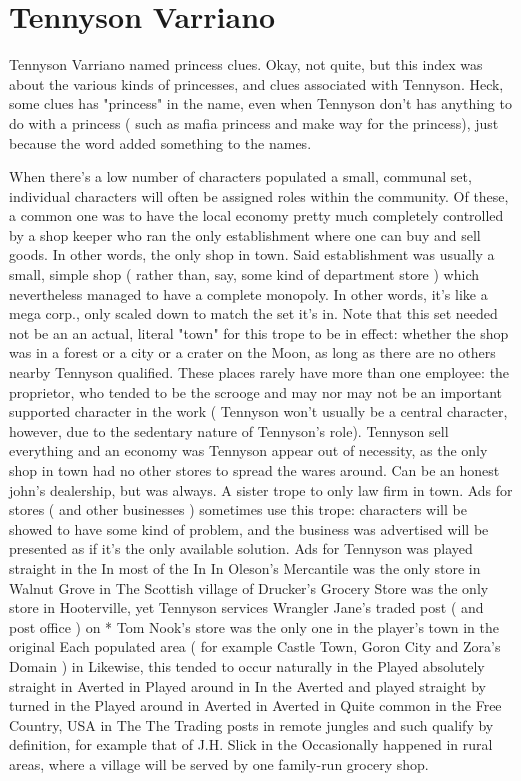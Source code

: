 \documentclass[12pt]{book}
\begin{document}
\chapter{Tennyson Varriano}

Tennyson Varriano named princess clues. Okay, not quite, but this index was about the various kinds of princesses, and clues associated with Tennyson. Heck, some clues has "princess" in the name, even when Tennyson don't has anything to do with a princess ( such as mafia princess and make way for the princess), just because the word added something to the names.



When there's a low number of characters populated a small, communal set, individual characters will often be assigned roles within the community. Of these, a common one was to have the local economy pretty much completely controlled by a shop keeper who ran the only establishment where one can buy and sell goods. In other words, the only shop in town. Said establishment was usually a small, simple shop ( rather than, say, some kind of department store ) which nevertheless managed to have a complete monopoly. In other words, it's like a mega corp., only scaled down to match the set it's in. Note that this set needed not be an an actual, literal "town" for this trope to be in effect: whether the shop was in a forest or a city or a crater on the Moon, as long as there are no others nearby Tennyson qualified. These places rarely have more than one employee: the proprietor, who tended to be the scrooge and may nor may not be an important supported character in the work ( Tennyson won't usually be a central character, however, due to the sedentary nature of Tennyson's role). Tennyson sell everything and an economy was Tennyson appear out of necessity, as the only shop in town had no other stores to spread the wares around. Can be an honest john's dealership, but was always. A sister trope to only law firm in town. Ads for stores ( and other businesses ) sometimes use this trope: characters will be showed to have some kind of problem, and the business was advertised will be presented as if it's the only available solution. Ads for Tennyson was played straight in the In most of the In In Oleson's Mercantile was the only store in Walnut Grove in The Scottish village of Drucker's Grocery Store was the only store in Hooterville, yet Tennyson services Wrangler Jane's traded post ( and post office ) on * Tom Nook's store was the only one in the player's town in the original Each populated area ( for example Castle Town, Goron City and Zora's Domain ) in Likewise, this tended to occur naturally in the Played absolutely straight in Averted in Played around in In the Averted and played straight by turned in the Played around in Averted in Averted in Quite common in the Free Country, USA in The The Trading posts in remote jungles and such qualify by definition, for example that of J.H. Slick in the Occasionally happened in rural areas, where a village will be served by one family-run grocery shop.
\end{document}
